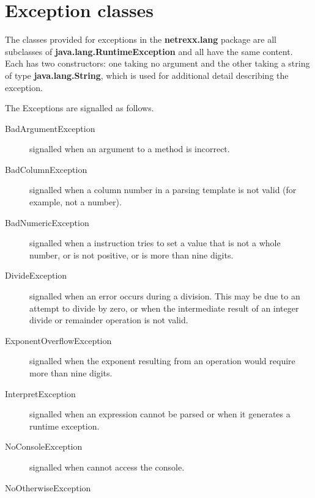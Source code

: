 \section{Exception classes}\label{refnlexcep}
 
The classes provided for exceptions in the \textbf{netrexx.lang} package
are all subclasses of \textbf{java.lang.RuntimeException} and all have
the same content.  Each has two constructors: one taking no argument and
the other taking a string of type \textbf{java.lang.String}, which is
used for additional detail describing the exception.
 
The Exceptions are signalled as follows.
\begin{description}
\item[BadArgumentException]\label{refexpbae}
 signalled when an argument to a method is incorrect.
\item[BadColumnException]\label{refexpbce}
 signalled when a column number in a parsing template is not valid
(for example, not a number).
\item[BadNumericException]\label{refexpbne}
 signalled when a  instruction tries to set
a value that is not a whole number, or is not positive, or is more than
nine digits.
\item[DivideException]\label{refexpdve}
 signalled when an error occurs during a division.  This may be due
to an attempt to divide by zero, or when the intermediate result of an
integer divide or remainder operation is not valid.
\item[ExponentOverflowException]\label{refexpeoe}
signalled when the exponent resulting from an operation would
require more than nine digits.
\item[InterpretException]\label{refexpie}
signalled when an  expression cannot be parsed or when it generates a runtime exception.
\item[NoConsoleException]\label{refexpnoc}
signalled when  cannot access the console.
\item[NoOtherwiseException]\label{refexpnoe}

\end{description}
